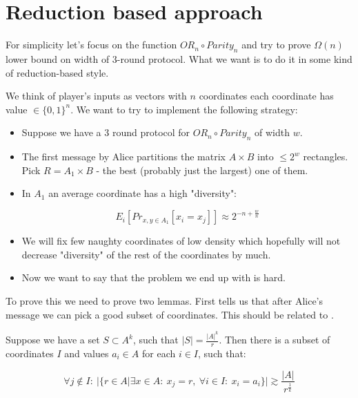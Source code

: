\section{Reduction based approach}

For simplicity let's focus on the function $OR_n \circ Parity_n$ and try to prove $\Omega(n)$ lower bound on width of $3$-round protocol. What we want is to do it in some kind of reduction-based style.

We think of player's inputs as vectors with $n$ coordinates each coordinate has value $\in \{0,1\}^n$. We want to try to implement the following strategy:

\begin{itemize}
    \item Suppose we have a $3$ round protocol for $OR_n \circ Parity_n$ of width $w$.
    
    \item The first message by Alice partitions the matrix $A \times B$ into $\leq 2^w$ rectangles. Pick $R = A_1 \times B$ - the best (probably just the largest) one of them.
    
    \item
    In $A_1$ an average coordinate has a high "diversity": 
    
    \[E_i[Pr_{x,y \in A_1}[x_i = x_j]] \approx 2^{-n + \frac{w}{n}}  \]
    
    \item
    We will fix few naughty coordinates of low density which hopefully will not decrease "diversity" of the rest of the coordinates by much.
    \item
    Now we want to say that the problem we end up with is hard.
\end{itemize}

To prove this we need to prove two lemmas. First tells us that after Alice's message we can pick a good subset of coordinates. This should be related to \cite{meir2017prediction}.

\begin{lemma}
    Suppose we have a set $S \subset A^k$, such that $|S| = \frac{|A|^k}{r}$. Then there is a subset of coordinates $I$ and values $a_i \in A$ for each $i \in I$, such that:
    
    \[ \forall j \not\in I:~  |\{r \in A| \exists x \in A:~  x_j = r, ~ \forall i \in I: ~ x_i = a_i\}| \gtrsim \frac{|A|}{r^{\frac{1}{k}}}  \]
    
\end{lemma}


